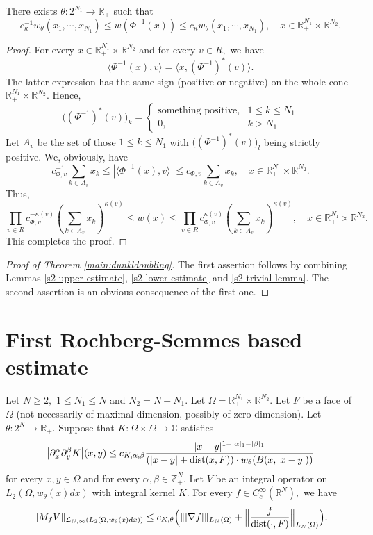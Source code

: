 \documentclass{amsart}
\begin{document}
\begin{lemma}\label{s2 trivial lemma} There exists $\theta:2^{N_1}\to\mathbb{R}_+$ such that
$$c_{\kappa}^{-1}w_{\theta}(x_1,\cdots,x_{N_1})\leq w(\Phi^{-1}(x))\leq c_{\kappa}w_{\theta}(x_1,\cdots,x_{N_1}),\quad x\in\mathbb{R}_+^{N_1}\times\mathbb{R}^{N_2}.$$
\end{lemma}
\begin{proof} For every $x\in\mathbb{R}^{N_1}_+\times\mathbb{R}^{N_2}$ and for every $v\in R,$ we have
$$\langle \Phi^{-1}(x),v\rangle=\langle x,(\Phi^{-1})^{\ast}(v)\rangle.$$
The latter expression has the same sign (positive or negative) on the whole cone $\mathbb{R}^{N_1}_+\times\mathbb{R}^{N_2}.$ Hence,
$$\big((\Phi^{-1})^{\ast}(v)\big)_k=
\begin{cases}
\mbox{something positive},& 1\leq k\leq N_1\\
0,& k>N_1
\end{cases}
$$
Let $A_v$ be the set of those $1\leq k\leq N_1$ with $\big((\Phi^{-1})^{\ast}(v)\big)_l$ being strictly positive. We, obviously, have
$$c_{\Phi,v}^{-1}\sum_{k\in A_v}x_k\leq |\langle \Phi^{-1}(x),v\rangle|\leq c_{\Phi,v}\sum_{k\in A_v}x_k,\quad x\in \mathbb{R}^{N_1}_+\times\mathbb{R}^{N_2}.$$
Thus,
$$\prod_{v\in R}c_{\Phi,v}^{-\kappa(v)}(\sum_{k\in A_v}x_k)^{\kappa(v)}\leq w(x)\leq \prod_{v\in R}c_{\Phi,v}^{\kappa(v)}(\sum_{k\in A_v}x_k)^{\kappa(v)},\quad x\in\mathbb{R}_+^{N_1}\times\mathbb{R}^{N_2}.$$
This completes the proof.
\end{proof}

\begin{proof}[Proof of Theorem \ref{main:dunkldoubling}] The first assertion follows by combining Lemmas \ref{s2 upper estimate}, \ref{s2 lower estimate} and \ref{s2 trivial lemma}. The second assertion is an obvious consequence of the first one.
\end{proof}


\section{First Rochberg-Semmes based estimate}

\begin{theorem}\label{first RS-type theorem} Let $N\geq 2,$ $1\leq N_1\leq N$ and $N_2=N-N_1.$ Let $\Omega=\mathbb{R}^{N_1}_+\times\mathbb{R}^{N_2}.$ Let $F$ be a face of $\Omega$ (not necessarily of maximal dimension, possibly of zero dimension). Let $\theta:2^N\to\mathbb{R}_+.$ Suppose that $K:\Omega\times\Omega\to\mathbb{C}$
satisfies
$$\bigl|\partial_x^{\alpha}\partial_y^{\beta}K\bigr|(x,y)\leq c_{K,\alpha,\beta}\frac{|x-y|^{1-|\alpha|_1-|\beta|_1}}{(|x-y|+{\rm dist}(x,F))\cdot w_{\theta}(B(x,|x-y|))}$$
for every $x,y\in\Omega$ and for every $\alpha,\beta\in\mathbb{Z}^N_+.$ Let $V$ be an integral operator on $L_2(\Omega,w_{\theta}(x)dx)$ with integral kernel $K.$ For every $f\in C^{\infty}_c(\mathbb{R}^N),$ we have
$$\|M_fV\|_{\mathcal{L}_{N,\infty}(L_2(\Omega,w_{\theta}(x)dx))}\leq c_{K,\theta}\Big(\||\nabla f|\|_{L_N(\Omega)}+\Big\|\frac{f}{{\rm dist}(\cdot,F)}\Big\|_{L_N(\Omega)}\Big).$$
\end{theorem}
\end{document}
